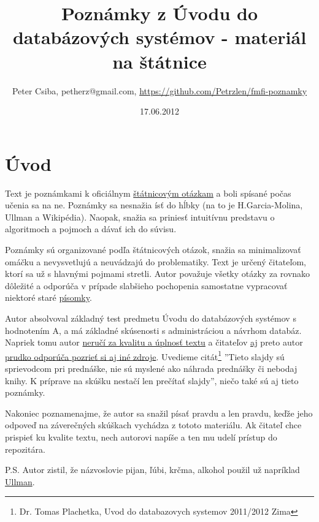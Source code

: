 \documentclass[10pt,a4paper]{article}
\title{Poznámky z Úvodu do databázových systémov - materiál na štátnice}
\date{17.06.2012}
\author{Peter Csiba, petherz@gmail.com, \url{https://github.com/Petrzlen/fmfi-poznamky}}
\begin{document}
\maketitle
\tableofcontents

\clearpage

\section*{Úvod}

Text je poznámkami k oficiálnym \href{http://new.dcs.fmph.uniba.sk/index.php/Studium/Bakalarske/StatneSkusky}{štátnicovým otázkam} a boli spísané počas učenia sa na ne.
Poznámky sa nesnažia ísť do hĺbky (na to je H.Garcia-Molina, Ullman a Wikipédia).
Naopak, snažia sa priniesť intuitívnu predstavu o algoritmoch a pojmoch a dávať ich do súvisu.

Poznámky sú organizované podľa štátnicových otázok, snažia sa minimalizovať omáčku a nevysvetlujú a neuvádzajú do problematiky. Text je určený čitateľom, ktorí sa už s hlavnými pojmami stretli.
Autor považuje všetky otázky za rovnako dôležité a odporúča v prípade slabšieho pochopenia samostatne vypracovať niektoré staré \href{http://www.dcs.fmph.uniba.sk/~plachetk/TEACHING/DB2011/index.html}{písomky}.

Autor absolvoval základný test predmetu Úvodu do databázových systémov s hodnotením A, a má základné skúsenosti s administráciou a návrhom databáz. Napriek tomu autor \underline{neručí za kvalitu a úplnosť textu} a čitateľov \underline{aj} preto autor \underline{prudko odporúča pozrieť si aj iné zdroje}. Uvedieme citát\footnote{Dr. Tomas Plachetka, Uvod do databazovych systemov 2011/2012 Zima} ''Tieto slajdy sú sprievodcom pri prednáške, nie sú myslené ako náhrada
prednášky či nebodaj knihy. K príprave na skúšku nestačí len prečítať slajdy'', niečo také sú aj tieto poznámky.

Nakoniec poznamenajme, že autor sa snažil písať pravdu a len pravdu, keďže jeho odpoveď na záverečných skúškach vychádza z tototo materiálu.
Ak čitateľ chce prispieť ku kvalite textu, nech autorovi napíše a ten mu udelí prístup do repozitára.

P.S. Autor zistil, že názvoslovie pijan, ľúbi, krčma, alkohol použil už napríklad \href{http://csip.sk/uploads/ullman.pdf}{Ullman}.

\end{document}
